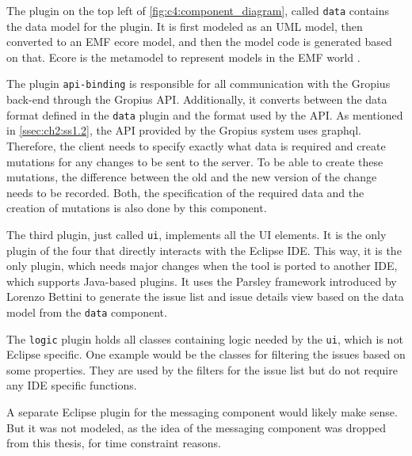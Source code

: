 The plugin on the top left of \cref{fig:c4:component_diagram}, called \lstinline|data| contains the data model for the plugin. 
It is first modeled as an \gls{UML} model, then converted to an \gls{EMF} ecore model, and then the model code is generated based on that.
Ecore is the metamodel to represent models in the \gls{EMF} world \cite{steinberg2008emf}.

The plugin \lstinline|api-binding| is responsible for all communication with the \gls{Gropius} back-end through the \gls{Gropius} \gls{API}.
Additionally, it converts between the data format defined in the \lstinline|data| plugin and the format used by the \gls{API}.
As mentioned in \cref{ssec:ch2:ss1.2}, the \gls{API} provided by the Gropius system uses \gls{graphql}.
Therefore, the client needs to specify exactly what data is required and create mutations for any changes to be sent to the server.
To be able to create these mutations, the difference between the old and the new version of the change needs to be recorded.
Both, the specification of the required data and the creation of mutations is also done by this component.

The third plugin, just called \lstinline|ui|, implements all the \gls{UI} elements.
It is the only plugin of the four that directly interacts with the \gls{Eclipse} \gls{IDE}.
This way, it is the only plugin, which needs major changes when the tool is ported to another \gls{IDE}, which supports Java-based plugins.
It uses the \gls{Parsley} framework introduced by Lorenzo Bettini \cite{bettini2014developing} to generate the issue list and issue details view 
based on the data model from the \lstinline|data| component.

The \lstinline|logic| plugin holds all classes containing logic needed by the \lstinline|ui|, which is not \gls{Eclipse} specific.
One example would be the classes for filtering the issues based on some properties.
They are used by the filters for the issue list but do not require any \gls{IDE} specific functions.

A separate \gls{Eclipse} plugin for the messaging component would likely make sense.
But it was not modeled, as the idea of the messaging component was dropped from this thesis, for time constraint reasons.

